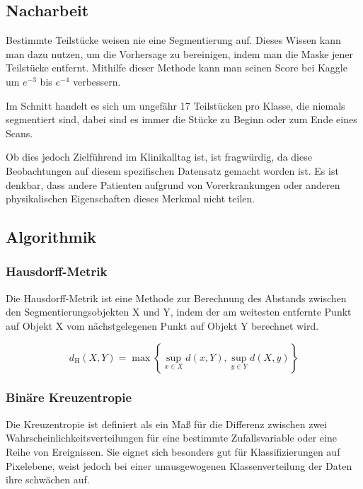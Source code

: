 \subsection{Nacharbeit}

Bestimmte Teilstücke weisen nie eine Segmentierung auf. Dieses Wissen kann man dazu nutzen, um die Vorhersage zu bereinigen, indem man die Maske jener Teilstücke entfernt. Mithilfe dieser Methode kann man seinen Score bei Kaggle um ${e^{-3}}$ bis ${e^{-4}}$ verbessern. 

Im Schnitt handelt es sich um ungefähr 17 Teilstücken pro Klasse, die niemals segmentiert sind, dabei sind es immer die Stücke zu Beginn oder zum Ende eines Scans.

Ob dies jedoch Zielführend im Klinikalltag ist, ist fragwürdig, da diese Beobachtungen auf diesem spezifischen Datensatz gemacht worden ist. Es ist denkbar, dass andere Patienten aufgrund von Vorerkrankungen oder anderen physikalischen Eigenschaften dieses Merkmal nicht teilen.

\pagebreak

\subsection{Algorithmik}

\subsubsection{Hausdorff-Metrik} \label{ssec:hdorff}
Die Hausdorff-Metrik ist eine Methode zur Berechnung des Abstands zwischen den Segmentierungsobjekten X und Y, indem der am weitesten entfernte Punkt auf Objekt X vom nächstgelegenen Punkt auf Objekt Y berechnet wird.

\begin{equation}
d_{\mathrm{H}}(X, Y)=\max \left\{\sup _{x \in X} d(x, Y), \sup _{y \in Y} d(X, y)\right\}
\end{equation}

\subsubsection{Binäre Kreuzentropie} \label{ssec:bce}

Die Kreuzentropie ist definiert als ein Maß für die Differenz zwischen zwei Wahrscheinlichkeitsverteilungen für eine bestimmte Zufallsvariable oder eine Reihe von Ereignissen. Sie eignet sich besonders gut für Klassifizierungen auf Pixelebene, weist jedoch bei einer unausgewogenen Klassenverteilung der Daten ihre schwächen auf. \citet{Jadon_2020} 

